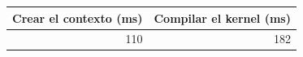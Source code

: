 \begin{tabular}{rr}
\toprule
Crear el contexto (ms) & Compilar el kernel (ms) \\
\midrule
110 & 182 \\
\bottomrule
\end{tabular}
